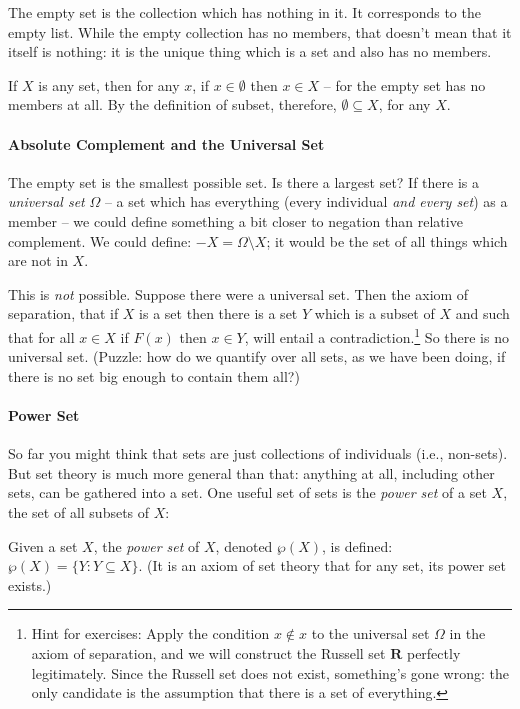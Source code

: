 The empty set is the collection which has nothing in it. It corresponds to the empty list. While the empty collection has no members, that doesn't mean that it itself is nothing: it is the unique thing which is a set and also has no members. 

 If $X$ is any set, then for any $x$, if $x \in \emptyset$ then $x\in X$ – for the empty set has no members at all. By the definition of subset, therefore, $\emptyset \subseteq X$, for any $X$.

\paragraph{Absolute Complement and the Universal Set}

The empty set is the smallest possible set. Is there a largest set? If there is a \emph{universal set} $\Omega$ – a set which has everything (every individual \emph{and every set}) as a member – we could define something a bit closer to negation than relative complement. We could define: $-X = \Omega \setminus X$; it would be the set of all things which are not in $X$.

This is \emph{not} possible. Suppose there were a universal set. Then the axiom of separation, that if $X$ is a set then there is a set $Y$ which is a subset of $X$ and such that for all $x\in X$ if $F(x)$ then $x\in Y$, will entail a contradiction.\footnote{Hint for exercises: Apply the condition $x\notin x$ to the universal set $\Omega$ in the axiom of separation, and we will construct the Russell set $\mathbf{R}$ perfectly legitimately. Since the Russell set does not exist, something's gone wrong: the only candidate is the assumption that there is a set of everything.} So there is no universal set. (Puzzle: how do we quantify over all sets, as we have been doing, if there is no set big enough to contain them all?)

\paragraph{Power Set}

So far you might think that sets are just collections of individuals (i.e., non-sets). But set theory is much more general than that: anything at all, including other sets, can be gathered into a set.
One useful set of sets is the \emph{power set} of a set $X$, the set of all subsets of $X$:

 \begin{definition}Given a set $X$, the {\em power set} of $X$, denoted $\wp(X)$, is
defined: $\wp(X) = \{Y: Y \subseteq X\}$. (It is an axiom of set theory that for any set, its power set exists.)\end{definition} 

